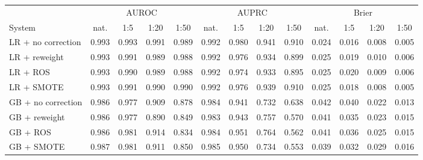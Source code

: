 \begin{tabular}{lcccccccccccc}
\toprule
 & \multicolumn{4}{c}{AUROC} & \multicolumn{4}{c}{AUPRC} & \multicolumn{4}{c}{Brier} \\
System & nat. & 1:5 & 1:20 & 1:50 & nat. & 1:5 & 1:20 & 1:50 & nat. & 1:5 & 1:20 & 1:50 \\
\midrule
LR + no correction & 0.993 & 0.993 & 0.991 & 0.989 & 0.992 & 0.980 & 0.941 & 0.910 & 0.024 & 0.016 & 0.008 & 0.005 \\
LR + reweight & 0.993 & 0.991 & 0.989 & 0.988 & 0.992 & 0.976 & 0.934 & 0.899 & 0.025 & 0.019 & 0.010 & 0.006 \\
LR + ROS & 0.993 & 0.990 & 0.989 & 0.988 & 0.992 & 0.974 & 0.933 & 0.895 & 0.025 & 0.020 & 0.009 & 0.006 \\
LR + SMOTE & 0.993 & 0.991 & 0.990 & 0.990 & 0.992 & 0.976 & 0.939 & 0.910 & 0.025 & 0.018 & 0.008 & 0.005 \\
\midrule
GB + no correction & 0.986 & 0.977 & 0.909 & 0.878 & 0.984 & 0.941 & 0.732 & 0.638 & 0.042 & 0.040 & 0.022 & 0.013 \\
GB + reweight & 0.986 & 0.977 & 0.890 & 0.849 & 0.983 & 0.943 & 0.757 & 0.570 & 0.041 & 0.035 & 0.023 & 0.015 \\
GB + ROS & 0.986 & 0.981 & 0.914 & 0.834 & 0.984 & 0.951 & 0.764 & 0.562 & 0.041 & 0.036 & 0.025 & 0.015 \\
GB + SMOTE & 0.987 & 0.981 & 0.911 & 0.850 & 0.985 & 0.950 & 0.734 & 0.553 & 0.039 & 0.032 & 0.029 & 0.016 \\
\bottomrule
\end{tabular}